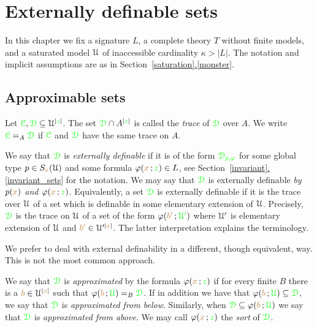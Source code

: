 \documentclass[creche.tex]{subfiles}
\begin{document}
\chapter{Externally definable sets}
\label{external}

\def\medrel#1{\parbox[t]{6ex}{$\displaystyle\hfil #1$}}
\def\ceq#1#2#3{\parbox{25ex}{$\displaystyle #1$}\medrel{#2}$\displaystyle  #3$}



In this chapter we fix a signature $L$, a complete theory $T$ without finite models, and a saturated model $\EuScript U$ of inaccessible cardinality $\kappa>|L|$.
The notation and implicit assumptions are as in Section~\hyperref[monster]{\ref*{saturation}.\ref*{monster}}.



\section{Approximable sets}
\label{approximable}

\def\ceq#1#2#3{\parbox{25ex}{$\displaystyle #1$}\medrel{#2}$\displaystyle  #3$}

Let ${\color{green}\EuScript C},{\color{green}\EuScript D}\subseteq\EuScript U^{|{\color{green} z}|}$.
The set ${\color{green}\EuScript D}\cap A^{|{\color{green} z}|}$ is called the \emph{trace\/} of ${\color{green}\EuScript D}$ over $A$.
We write ${\color{green}\EuScript C}=_A{\color{green}\EuScript D}$ if  ${\color{green}\EuScript C}$ and ${\color{green}\EuScript D}$ have the same trace on $A$.

We say that ${\color{green}\EuScript D}$ is \emph{externally definable\/} if it is of the form ${\color{green}\EuScript D_{p,\varphi}}$ for some global type $p\in S_{\color{brown} x}(\EuScript U)$ and some formula $\varphi({\color{brown} x}\,;{\color{green} z})\in L$, see Section~\hyperref[invariant_sets]{\ref*{invariant}.\ref*{invariant_sets}} for the notation.
We may say that ${\color{green}\EuScript D}$ is externally definable \emph{by $p({\color{brown} x})$ and $\varphi({\color{brown} x}\,;{\color{green} z})$}.
Equivalently, a set ${\color{green}\EuScript D}$ is externally definable if it is the trace over $\EuScript U$ of a set which is definable in some elementary extension of $\EuScript U$.
Precisely, ${\color{green}\EuScript D}$ is the trace on $\EuScript U$ of a set of the form $\varphi({\color{brown} b'}\,;{\color{green}\EuScript U'})$ where $\EuScript U'$ is elementary extension of $\EuScript U$ and ${\color{brown} b'}\in\EuScript U'^{|{\color{brown} x}|}$.
The latter interpretation explains the terminology.

\noindent\llap{\textcolor{red}{\Large\danger}\kern1.5ex}We prefer to deal with external definability in a different, though equivalent, way.
This is not the most common approach.

\begin{definition}\label{def_epprox}
We say that ${\color{green}\EuScript D}$ is \emph{approximated\/} by the formula $\varphi({\color{brown} x}\,;{\color{green} z})$ if for every finite $B$ there is a ${\color{brown} b}\in\EuScript U^{|{\color{brown} x}|}$ such that $\varphi({\color{brown} b}\,;{\color{green}\EuScript U})=_B{\color{green}\EuScript D}$.
If in addition we have that $\varphi({\color{brown} b}\,;{\color{green}\EuScript U})\subseteq{\color{green}\EuScript D}$, we say that  ${\color{green}\EuScript D}$ is \emph{approximated from below}.
Similarly, when ${\color{green}\EuScript D}\subseteq\varphi({\color{brown} b}\,;{\color{green}\EuScript U})$ we say that  ${\color{green}\EuScript D}$ is \emph{approximated from above}.
We may call $\varphi({\color{brown} x}\,;{\color{green} z})$ the \emph{sort} of ${\color{green}\EuScript D}$.\QED
\end{definition} 
 
\end{document}
